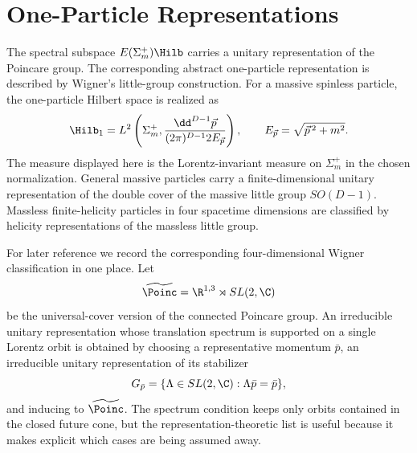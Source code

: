 \section{One-Particle Representations}

\begin{definition}
\label{def:massive-scalar-wigner-one-particle-space}
The spectral subspace \(E(\Sigma_m^+)\Hilb\) carries a unitary
representation of the Poincare group.  The corresponding abstract
one-particle representation is described by Wigner's little-group
construction.  For a massive spinless particle, the one-particle Hilbert
space is realized as
\[
  \Hilb_1
  =
  L^2\left(
    \Sigma_m^+,
    \frac{\dd^{D-1}\vec p}{(2\pi)^{D-1}2E_{\vec p}}
  \right),
  \qquad
  E_{\vec p}=\sqrt{\vec p^{\,2}+m^2}.
\]
The measure displayed here is the Lorentz-invariant measure on \(\Sigma_m^+\)
in the chosen normalization. General massive particles carry a
finite-dimensional unitary representation of the double cover of the massive
little group \(SO(D-1)\). Massless finite-helicity particles in four spacetime
dimensions are classified by helicity representations of the massless little
group.
\end{definition}

\begin{definition}
\label{def:four-dimensional-wigner-orbit-datum}
For later reference we record the corresponding four-dimensional Wigner
classification in one place.  Let
\[
  \widetilde{\Poinc}=\R^{1,3}\rtimes SL(2,\C)
\]
be the universal-cover version of the connected Poincare group.  An
irreducible unitary representation whose translation spectrum is supported on
a single Lorentz orbit is obtained by choosing a representative momentum
\(\bar p\), an irreducible unitary representation of its stabilizer
\[
  G_{\bar p}=\{\Lambda\in SL(2,\C):\Lambda \bar p=\bar p\},
\]
and inducing to \(\widetilde{\Poinc}\).  The spectrum condition keeps only
orbits contained in the closed future cone, but the representation-theoretic
list is useful because it makes explicit which cases are being assumed away.
\end{definition}

